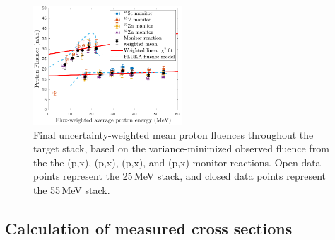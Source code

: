 \begin{figure}
 \centering
 \includegraphics[width=0.495\textwidth]{./figures/fluence_plot.pdf}
 \caption{Final uncertainty-weighted mean proton fluences throughout the target stack, based on the variance-minimized observed fluence from the the  (p,x), (p,x), (p,x), and (p,x) monitor reactions. Open data points represent the 25\,MeV stack, and closed data points represent the 55\,MeV stack.} 
 \label{fig:fe_fluence_plot}
\end{figure}






\subsection{\label{sec:calcs_sec_fe}Calculation of measured cross sections}


